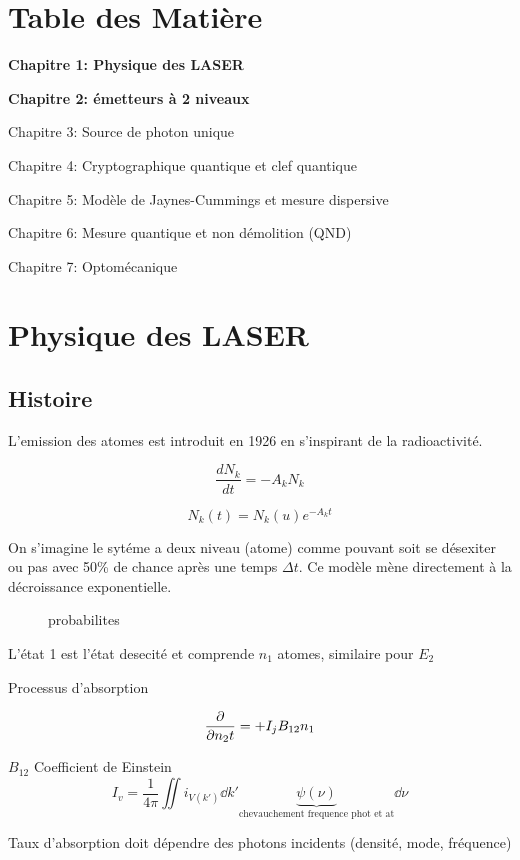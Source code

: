 \section*{Table des Matière}

\bf{Chapitre 1}: Physique des LASER

\bf{Chapitre 2}: émetteurs à 2 niveaux

Chapitre 3: Source de photon unique

Chapitre 4: Cryptographique quantique et clef quantique

Chapitre 5: Modèle de Jaynes-Cummings et mesure dispersive

Chapitre 6: Mesure quantique et non démolition (QND)

Chapitre 7: Optomécanique


\section{Physique des LASER}


\subsection{Histoire}

L'emission des atomes est introduit en 1926 en s'inspirant de la radioactivité. 

$$\frac{d {N_k}}{d {t}} = - A_k N_k$$

$$N_k(t) = N_k(u) e^{-A_k t}$$ 


On s'imagine le sytéme a deux niveau (atome) comme pouvant soit se désexiter ou pas avec 50\% de chance après une temps $\Delta t$. Ce modèle mène directement à la décroissance exponentielle.

\begin{figure}[ht]
    \centering
    \caption{probabilites}
    \label{fig:probabilites}
\end{figure}

L'état 1 est l'état desecité et comprende $n_1$ atomes, similaire pour $E_2$  

Processus d'absorption

$$\pdv{n_{2}{t}} = +I_j B_{12} n_1$$ 

$B_{12} $ Coefficient de Einstein 
$$I_v = \frac{1}{4\pi} \iint i_{V(k')} \dd k' \underbrace{\psi(\nu)}_{\text{chevauchement frequence phot et at} } \dd\nu$$ 


Taux d'absorption doit dépendre des photons incidents (densité, mode, fréquence)

